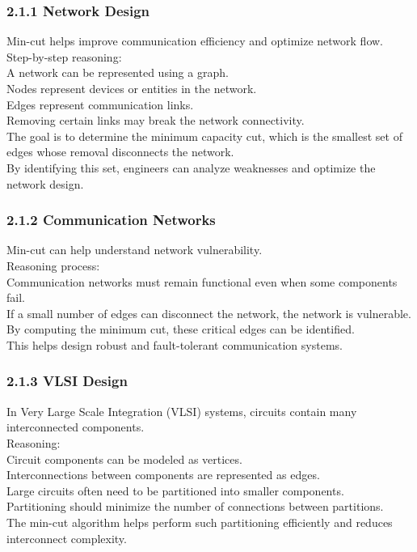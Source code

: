 \documentclass{article}
\begin{document}
\subsubsection{2.1.1 Network Design}
Min-cut helps improve communication efficiency and optimize network flow. \\
Step-by-step reasoning: \\
A network can be represented using a graph. \\
Nodes represent devices or entities in the network. \\
Edges represent communication links. \\
Removing certain links may break the network connectivity. \\
The goal is to determine the minimum capacity cut, which is the smallest set of edges whose removal disconnects the network. \\
By identifying this set, engineers can analyze weaknesses and optimize the network design.

\subsubsection{2.1.2 Communication Networks}
Min-cut can help understand network vulnerability. \\
Reasoning process: \\
Communication networks must remain functional even when some components fail. \\
If a small number of edges can disconnect the network, the network is vulnerable. \\
By computing the minimum cut, these critical edges can be identified. \\
This helps design robust and fault-tolerant communication systems.

\subsubsection{2.1.3 VLSI Design}
In Very Large Scale Integration (VLSI) systems, circuits contain many interconnected components. \\
Reasoning: \\
Circuit components can be modeled as vertices. \\
Interconnections between components are represented as edges. \\
Large circuits often need to be partitioned into smaller components. \\
Partitioning should minimize the number of connections between partitions. \\
The min-cut algorithm helps perform such partitioning efficiently and reduces interconnect complexity.
\end{document}
